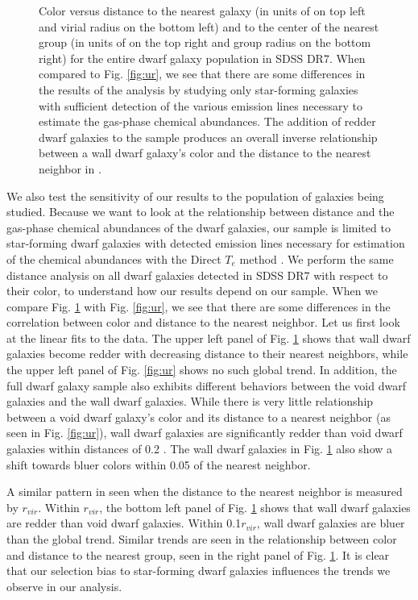 \begin{figure}
    \caption[Color versus distance of full SDSS dwarf population]{Color versus 
    distance to the nearest galaxy (in units of \hMpc on top left and virial 
    radius on the bottom left) and to the center of the nearest group (in units 
    of \hMpc on the top right and group radius on the bottom right) for the 
    entire dwarf galaxy population in SDSS DR7.  When compared to Fig. 
    \ref{fig:ur}, we see that there are some differences in the results of the 
    analysis by studying only star-forming galaxies with sufficient detection of 
    the various emission lines necessary to estimate the gas-phase chemical 
    abundances.  The addition of redder dwarf galaxies to the sample produces an 
    overall inverse relationship between a wall dwarf galaxy's color and the 
    distance to the nearest neighbor in \hMpc.}
    \label{fig:ur_allDwarf}
\end{figure}

We also test the sensitivity of our results to the population of galaxies being 
studied.  Because we want to look at the relationship between distance and the 
gas-phase chemical abundances of the dwarf galaxies, our sample is limited to 
star-forming dwarf galaxies with detected emission lines necessary for 
estimation of the chemical abundances with the Direct $T_e$ method 
\citep[see][for more details]{Douglass17a}.  We perform the same distance 
analysis on all dwarf galaxies detected in SDSS DR7 with respect to their 
color, to understand how our results depend on our sample.  When we compare Fig. 
\ref{fig:ur_allDwarf} with Fig. \ref{fig:ur}, we see that there are some 
differences in the correlation between color and distance to the nearest 
neighbor.  Let us first look at the linear fits to the data.  The upper left 
panel of Fig. \ref{fig:ur_allDwarf} shows that wall dwarf galaxies become redder 
with decreasing distance to their nearest neighbors, while the upper left panel 
of Fig. \ref{fig:ur} shows no such global trend.  In addition, the full dwarf 
galaxy sample also exhibits different behaviors between the void dwarf galaxies 
and the wall dwarf galaxies.  While there is very little relationship between a 
void dwarf galaxy's color and its distance to a nearest neighbor (as seen in 
Fig. \ref{fig:ur}), wall dwarf galaxies are significantly redder than void dwarf 
galaxies within distances of 0.2 \hMpc.  The wall dwarf galaxies in Fig. 
\ref{fig:ur_allDwarf} also show a shift towards bluer colors within 0.05 \hMpc 
of the nearest neighbor.

A similar pattern in seen when the distance to the nearest neighbor is measured 
by $r_{vir}$.  Within $r_{vir}$, the bottom left panel of Fig. 
\ref{fig:ur_allDwarf} shows that wall dwarf galaxies are redder than void dwarf 
galaxies.  Within 0.1$r_{vir}$, wall dwarf galaxies are bluer than the global 
trend.  Similar trends are seen in the relationship between color and distance 
to the nearest group, seen in the right panel of Fig. \ref{fig:ur_allDwarf}.  It 
is clear that our selection bias to star-forming dwarf galaxies influences the 
trends we observe in our analysis.

